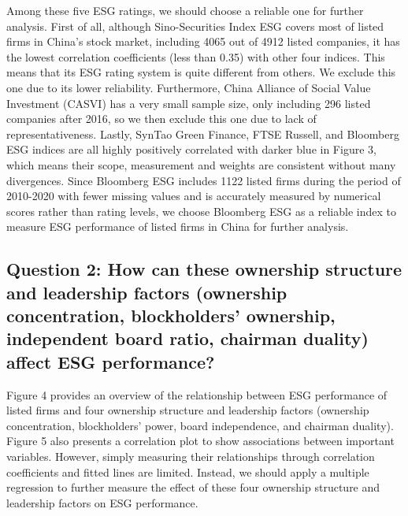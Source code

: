 \documentclass[
  12pt,
]{article}
\begin{document}
Among these five ESG ratings, we should choose a reliable one for
further analysis. First of all, although Sino-Securities Index ESG
covers most of listed firms in China's stock market, including 4065 out
of 4912 listed companies, it has the lowest correlation coefficients
(less than 0.35) with other four indices. This means that its ESG rating
system is quite different from others. We exclude this one due to its
lower reliability. Furthermore, China Alliance of Social Value
Investment (CASVI) has a very small sample size, only including 296
listed companies after 2016, so we then exclude this one due to lack of
representativeness. Lastly, SynTao Green Finance, FTSE Russell, and
Bloomberg ESG indices are all highly positively correlated with darker
blue in Figure 3, which means their scope, measurement and weights are
consistent without many divergences. Since Bloomberg ESG includes 1122
listed firms during the period of 2010-2020 with fewer missing values
and is accurately measured by numerical scores rather than rating
levels, we choose Bloomberg ESG as a reliable index to measure ESG
performance of listed firms in China for further analysis.

\hypertarget{question-2-how-can-these-ownership-structure-and-leadership-factors-ownership-concentration-blockholders-ownership-independent-board-ratio-chairman-duality-affect-esg-performance}{%
\subsection{Question 2: How can these ownership structure and leadership
factors (ownership concentration, blockholders' ownership, independent
board ratio, chairman duality) affect ESG
performance?}\label{question-2-how-can-these-ownership-structure-and-leadership-factors-ownership-concentration-blockholders-ownership-independent-board-ratio-chairman-duality-affect-esg-performance}}

Figure 4 provides an overview of the relationship between ESG
performance of listed firms and four ownership structure and leadership
factors (ownership concentration, blockholders' power, board
independence, and chairman duality). Figure 5 also presents a
correlation plot to show associations between important variables.
However, simply measuring their relationships through correlation
coefficients and fitted lines are limited. Instead, we should apply a
multiple regression to further measure the effect of these four
ownership structure and leadership factors on ESG performance.
\end{document}

